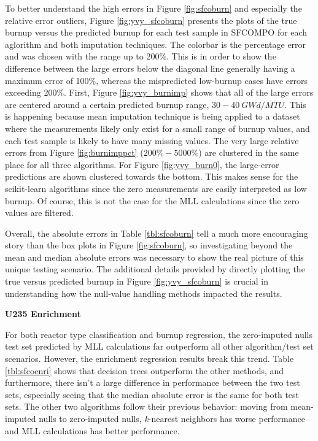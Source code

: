 To better understand the high errors in Figure \ref{fig:sfcoburn} and
especially the relative error outliers, Figure \ref{fig:yvy_sfcoburn} presents
the plots of the true burnup versus the predicted burnup for each test sample
in \gls{SFCOMPO} for each aglorithm and both imputation techniques.  The
colorbar is the percentage error and was chosen with the range up to 200\%.
This is in order to show the difference between the large errors below the
diagonal line generally having a maximum error of 100\%, whereas the
mispredicted low-burnup cases have errors exceeding 200\%.  First, Figure
\ref{fig:yvy_burnimp} shows that all of the large errors are centered around a
certain predicted burnup range, $30-40\:GWd/MTU$. This is happening because
mean imputation technique is being applied to a dataset where the measurements
likely only exist for a small range of burnup values, and each test sample is
likely to have many missing values.  The very large relative errors from Figure
\ref{fig:burnimppct} ($200\%-5000\%$) are clustered in the same place for all
three algorithms.  For Figure \ref{fig:yvy_burn0}, the large-error predictions
are shown clustered towards the bottom. This makes sense for the scikit-learn
algorithms since the zero measurements are easily interpreted as low burnup. Of
course, this is not the case for the \gls{MLL} calculations since the zero
values are filtered. 

Overall, the absolute errors in Table \ref{tbl:sfcoburn} tell a much more
encouraging story than the box plots in Figure \ref{fig:sfcoburn}, so
investigating beyond the mean and median absolute errors was necessary to show
the real picture of this unique testing scenario. The additional details
provided by directly plotting the true versus predicted burnup in Figure
\ref{fig:yvy_sfcoburn} is crucial in understanding how the null-value handling
methods impacted the results.

\noindent \textbf{\gls{U235} Enrichment}

For both reactor type classification and burnup regression, the zero-imputed
nulls test set predicted by \gls{MLL} calculations far outperform all other
algorithm/test set scenarios. However, the enrichment regression results break
this trend.  Table \ref{tbl:sfcoenri} shows that decision trees outperform the
other methods, and furthermore, there isn't a large difference in performance
between the two test sets, especially seeing that the median absolute error is
the same for both test sets.  The other two algorithms follow their previous
behavior: moving from mean-imputed nulls to zero-imputed nulls,
\textit{k}-nearest neighbors has worse performance and \gls{MLL} calculations
has better performance.

